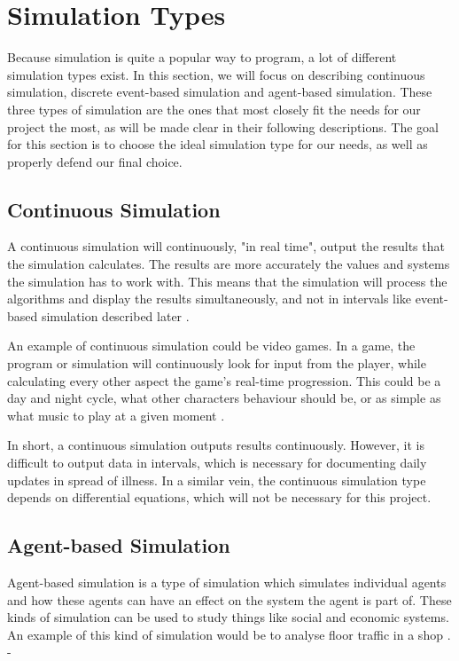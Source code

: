 \section{Simulation Types}

Because simulation is quite a popular way to program, a lot of different simulation types exist. In this section, we will focus on describing continuous simulation, discrete event-based simulation and agent-based simulation. These three types of simulation are the ones that most closely fit the needs for our project the most, as will be made clear in their following descriptions. The goal for this section is to choose the ideal simulation type for our needs, as well as properly defend our final choice.

\subsection{Continuous Simulation}
A continuous simulation will continuously, "in real time", output the results that the simulation calculates. The results are more accurately the values and systems the simulation has to work with. This means that the simulation will process the algorithms and display the results simultaneously, and not in intervals like event-based simulation described later \citep{howard_what_2020}.

An example of continuous simulation could be video games. In a game, the program or simulation will continuously look for input from the player, while calculating every other aspect the game's real-time progression. This could be a day and night cycle, what other characters behaviour should be, or as simple as what music to play at a given moment \citep{howard_what_2020}.

In short, a continuous simulation outputs results continuously. However, it is difficult to output data in intervals, which is necessary for documenting daily updates in spread of illness. In a similar vein, the continuous simulation type depends on differential equations, which will not be necessary for this project. 

\subsection{Agent-based Simulation}
Agent-based simulation is a type of simulation which simulates individual agents and how these agents can have an effect on the system the agent is part of. These kinds of simulation can be used to study things like social and economic systems. An example of this kind of simulation would be to analyse floor traffic in a shop \citep{howard_what_2020}. -

